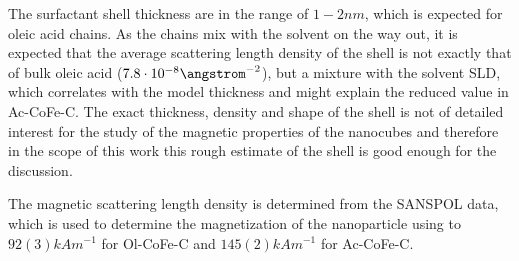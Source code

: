 \documentclass[\main/dresen_thesis.tex]{subfiles}
\begin{document}
    The surfactant shell thickness are in the range of $1 - 2 \unit{nm}$, which is expected for oleic acid chains.
    As the chains mix with the solvent on the way out, it is expected that the average scattering length density of the shell is not exactly that of bulk oleic acid ($7.8 \cdot 10^{-8} \angstrom^{-2}$), but a mixture with the solvent SLD, which correlates with the model thickness and might explain the reduced value in Ac-CoFe-C.
    The exact thickness, density and shape of the shell is not of detailed interest for the study of the magnetic properties of the nanocubes and therefore in the scope of this work this rough estimate of the shell is good enough for the discussion.

    The magnetic scattering length density is determined from the SANSPOL data, which is used to determine the magnetization of the nanoparticle using  to $92(3) \unit{kAm^{-1}}$ for Ol-CoFe-C and $145(2) \unit{kAm^{-1}}$ for Ac-CoFe-C.
\end{document}
